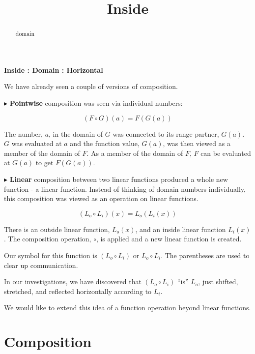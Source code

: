 \documentclass{ximera}
\title{Inside}
\begin{document}
\begin{abstract}
domain
\end{abstract}
\maketitle







\textbf{\textcolor{blue!55!black}{Inside : Domain : Horizontal}}




We have already seen a couple of versions of composition. 

$\blacktriangleright$ \textbf{\textcolor{purple!85!blue}{Pointwise}} composition was seen via individual numbers: 

\[ (F \circ G)(a) = F(G(a)) \]

The number, $a$, in the domain of $G$ was connected to its range partner, $G(a)$.  $G$ was evaluated at $a$ and the function value, $G(a)$, was then viewed as a member of the domain of $F$.  As a member of the domain of $F$, $F$ can be evaluated at $G(a)$ to get $F(G(a))$. 




$\blacktriangleright$ \textbf{\textcolor{purple!85!blue}{Linear}} composition between two linear functions produced a whole new function - a linear function.  Instead of thinking of domain numbers individually, this composition was viewed as an operation on linear functions.

\[    (L_o \circ L_i)(x) = L_o(L_i(x))  \]

There is an outside linear function, $L_o(x)$, and an inside linear function $L_i(x)$.  The composition operation, $\circ$, is applied and a new linear function is created.  



Our symbol for this function is $(L_o \circ L_i)$ or $L_o \circ L_i$.  The parentheses are used to clear up communication.

In our investigations, we have discovered that $(L_o \circ L_i)$ ``is'' $L_o$, just shifted, stretched, and reflected horizontally according to $L_i$.


We would like to extend this idea of a function operation beyond linear functions.





\section*{Composition}
\end{document}
